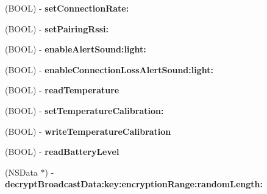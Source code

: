 \begin{DoxyCompactItemize}
\item 
\hypertarget{interface_le_snf_device_a966c291cf3fdc0d55367a5676a9181e8}{}(B\+O\+O\+L) -\/ {\bfseries set\+Connection\+Rate\+:}\label{interface_le_snf_device_a966c291cf3fdc0d55367a5676a9181e8}

\item 
\hypertarget{interface_le_snf_device_a4349f37ab6bdb2fb1eecbbc65cad7f58}{}(B\+O\+O\+L) -\/ {\bfseries set\+Pairing\+Rssi\+:}\label{interface_le_snf_device_a4349f37ab6bdb2fb1eecbbc65cad7f58}

\item 
\hypertarget{interface_le_snf_device_a244a9a67ae8c4776e83195e72ae843b0}{}(B\+O\+O\+L) -\/ {\bfseries enable\+Alert\+Sound\+:light\+:}\label{interface_le_snf_device_a244a9a67ae8c4776e83195e72ae843b0}

\item 
\hypertarget{interface_le_snf_device_ae4ffd60bf67f6a556966411f27b1661e}{}(B\+O\+O\+L) -\/ {\bfseries enable\+Connection\+Loss\+Alert\+Sound\+:light\+:}\label{interface_le_snf_device_ae4ffd60bf67f6a556966411f27b1661e}

\item 
\hypertarget{interface_le_snf_device_a98bffc69f90e9977ad819a6717028fc7}{}(B\+O\+O\+L) -\/ {\bfseries read\+Temperature}\label{interface_le_snf_device_a98bffc69f90e9977ad819a6717028fc7}

\item 
\hypertarget{interface_le_snf_device_a5d5194c13d27b3e0e34371e4fc78d057}{}(B\+O\+O\+L) -\/ {\bfseries set\+Temperature\+Calibration\+:}\label{interface_le_snf_device_a5d5194c13d27b3e0e34371e4fc78d057}

\item 
\hypertarget{interface_le_snf_device_a69c4af24f46dba7f75bbc0b8d9057cb0}{}(B\+O\+O\+L) -\/ {\bfseries write\+Temperature\+Calibration}\label{interface_le_snf_device_a69c4af24f46dba7f75bbc0b8d9057cb0}

\item 
\hypertarget{interface_le_snf_device_a586693cc1283546f4b79ab0dfaf7201a}{}(B\+O\+O\+L) -\/ {\bfseries read\+Battery\+Level}\label{interface_le_snf_device_a586693cc1283546f4b79ab0dfaf7201a}

\item 
\hypertarget{interface_le_snf_device_a33428be447bbe982c8ffcdfe3c7f648b}{}(N\+S\+Data $\ast$) -\/ {\bfseries decrypt\+Broadcast\+Data\+:key\+:encryption\+Range\+:random\+Length\+:}\label{interface_le_snf_device_a33428be447bbe982c8ffcdfe3c7f648b}


\end{DoxyCompactItemize}
